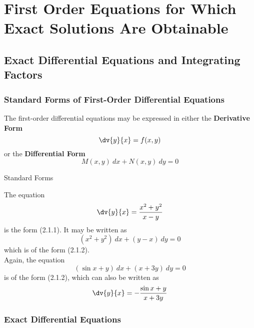 
\section{First Order Equations for Which Exact Solutions Are Obtainable}


\subsection{Exact Differential Equations and Integrating Factors}


\subsubsection{Standard Forms of First-Order Differential Equations}
The first-order differential equations may be expressed in either the \textbf{Derivative Form}
\begin{equation}
    \dv{y}{x} = f(x,y)
\end{equation}
or the \textbf{Differential Form}
\begin{equation}
    M(x,y) \: d{x} + N(x,y) \: d{y} = 0
\end{equation}

\begin{example}{Standard Forms}
    
    The equation \[
        \dv{y}{x} = \frac{x^2 + y^2}{x-y}
    \]
    is the form (2.1.1). It may be written as \[
        (x^2 + y^2) \: dx + (y-x) \: dy = 0
    \] which is of the form (2.1.2). \\
    Again, the equation \[
        (\sin x + y) \: dx + (x + 3y) \: dy = 0
    \] is of the form (2.1.2), which can also be written as \[
    \dv{y}{x} = - \frac{\sin x + y}{x + 3y}
    \]
\end{example}


\subsubsection{Exact Differential Equations}

